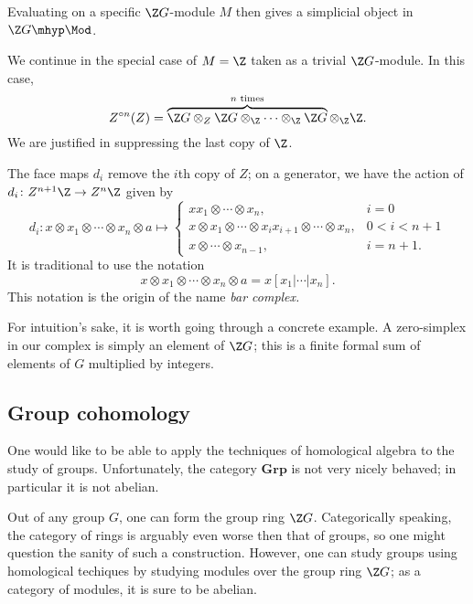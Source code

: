\documentclass[main.tex]{subfiles}
\begin{document}
\begin{example}
  Evaluating on a specific $\Z G$-module $M$ then gives a simplicial object in $\Z G\mhyp\Mod$.

  We continue in the special case of $M = \Z$ taken as a trivial $\Z G$-module. In this case,
  \begin{equation*}
    Z^{\circ  n}(Z) = \overbrace{\Z G \otimes_{Z} \Z G \otimes_{\Z} \cdots \otimes_{\Z} \Z G}^{n \text{ times}} \otimes_{\Z} \Z.
  \end{equation*}
  We are justified in suppressing the last copy of $\Z$.

  The face maps $d_{i}$ remove the $i$th copy of $Z$; on a generator, we have the action of $d_{i}\colon Z^{n+1}\Z \to Z^{n}\Z$ given by
  \begin{equation*}
    d_{i}\colon x \otimes x_{1} \otimes \cdots \otimes x_{n} \otimes a \mapsto
    \begin{cases}
      x x_{1} \otimes \cdots \otimes x_{n}, &i = 0 \\
      x \otimes x_{1} \otimes \cdots \otimes x_{i}x_{i+1} \otimes \cdots \otimes x_{n},& 0 < i < n+1 \\
      x \otimes \cdots \otimes x_{n-1}, &i = n+1.
    \end{cases}
  \end{equation*}
  It is traditional to use the notation
  \begin{equation*}
    x \otimes x_{1} \otimes \cdots \otimes x_{n} \otimes a = x[x_{1}| \cdots | x_{n}].
  \end{equation*}
  This notation is the origin of the name \emph{bar complex.}

  For intuition's sake, it is worth going through a concrete example. A zero-simplex in our complex is simply an element of $\Z G$; this is a finite formal sum of elements of $G$ multiplied by integers.
\end{example}

\subsection{Group cohomology}
\label{ssc:group_cohomology}

One would like to be able to apply the techniques of homological algebra to the study of groups. Unfortunately, the category $\mathbf{Grp}$ is not very nicely behaved; in particular it is not abelian.

Out of any group $G$, one can form the group ring $\Z G$. Categorically speaking, the category of rings is arguably even worse then that of groups, so one might question the sanity of such a construction. However, one can study groups using homological techiques by studying modules over the group ring $\Z G$; as a category of modules, it is sure to be abelian.
\end{document}
